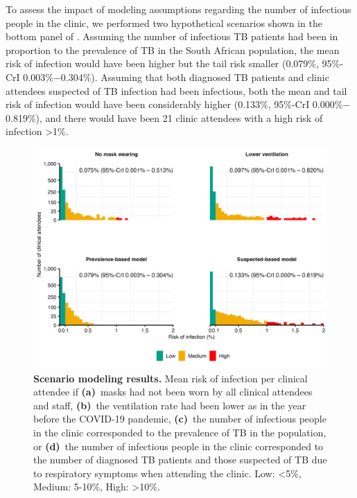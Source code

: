 \documentclass[fleqn,11pt]{wlscirep}
\begin{document}
To assess the impact of modeling assumptions regarding the number of infectious people in the clinic, we performed two hypothetical scenarios shown in the bottom panel of . Assuming the number of infectious TB patients had been in proportion to the prevalence of TB in the South African population, the mean risk of infection would have been higher but the tail risk smaller (0.079\%, 95\%-CrI 0.003\%$-$0.304\%). Assuming that both diagnosed TB patients and clinic attendees suspected of TB infection had been infectious, both the mean and tail risk of infection would have been considerably higher (0.133\%, 95\%-CrI 0.000\%$-$0.819\%), and there would have been 21 clinic attendees with a high risk of infection >1\%.  

\begin{figure}
    \centering
    \includegraphics{results/modeling/mean-roi-comparison.png}
    \caption{\textbf{Scenario modeling results.} Mean risk of infection per clinical attendee if \textbf{(a)}~masks had not been worn by all clinical attendees and staff, \textbf{(b)}~the ventilation rate had been lower as in the year before the COVID-19 pandemic, \textbf{(c)}~the number of infectious people in the clinic corresponded to the prevalence of TB in the population, or \textbf{(d)}~the number of infectious people in the clinic corresponded to the number of diagnosed TB patients and those suspected of TB due to respiratory symptoms when attending the clinic. Low: <5\%, Medium: 5-10\%, High: >10\%.}
    \label{fig:scenario-results}
\end{figure}
\end{document}
